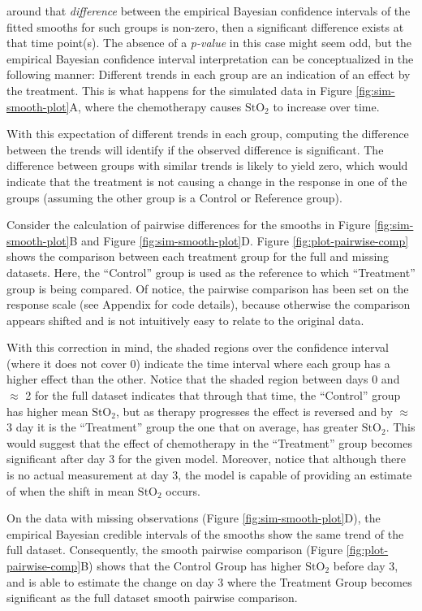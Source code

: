 \documentclass[
]{article}
\begin{document}
around that \emph{difference} between the empirical Bayesian confidence intervals of the fitted smooths for such groups is non-zero, then a significant difference exists at that time point(s). The absence of a \emph{p-value} in this case might seem odd, but the empirical Bayesian confidence interval interpretation can be conceptualized in the following manner: Different trends in each group are an indication of an effect by the treatment. This is what happens for the simulated data in Figure \ref{fig:sim-smooth-plot}A, where the chemotherapy causes \(\mbox{StO}_2\) to increase over time.

With this expectation of different trends in each group, computing the difference between the trends will identify if the observed difference is significant. The difference between groups with similar trends is likely to yield zero, which would indicate that the treatment is not causing a change in the response in one of the groups (assuming the other group is a Control or Reference group).

Consider the calculation of pairwise differences for the smooths in Figure \ref{fig:sim-smooth-plot}B and Figure \ref{fig:sim-smooth-plot}D. Figure \ref{fig:plot-pairwise-comp} shows the comparison between each treatment group for the full and missing datasets. Here, the ``Control'' group is used as the reference to which ``Treatment'' group is being compared. Of notice, the pairwise comparison has been set on the response scale (see Appendix for code details), because otherwise the comparison appears shifted and is not intuitively easy to relate to the original data.

With this correction in mind, the shaded regions over the confidence interval (where it does not cover 0) indicate the time interval where each group has a higher effect than the other. Notice that the shaded region between days 0 and \(\approx\) 2 for the full dataset indicates that through that time, the ``Control'' group has higher mean \(\mbox{StO}_2\), but as therapy progresses the effect is reversed and by \(\approx\) 3 day it is the ``Treatment'' group the one that on average, has greater \(\mbox{StO}_2\). This would suggest that the effect of chemotherapy in the ``Treatment'' group becomes significant after day 3 for the given model. Moreover, notice that although there is no actual measurement at day 3, the model is capable of providing an estimate of when the shift in mean \(\mbox{StO}_2\) occurs.

On the data with missing observations (Figure \ref{fig:sim-smooth-plot}D), the empirical Bayesian credible intervals of the smooths show the same trend of the full dataset. Consequently, the smooth pairwise comparison (Figure \ref{fig:plot-pairwise-comp}B) shows that the Control Group has higher \(\mbox{StO}_2\) before day 3, and is able to estimate the change on day 3 where the Treatment Group becomes significant as the full dataset smooth pairwise comparison.
\end{document}
